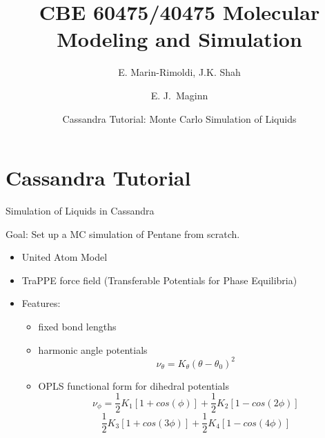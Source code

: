 \documentclass{beamer}
\title[Molecular Modeling and Simulation] %
{CBE 60475/40475 Molecular Modeling and Simulation}
\author[Marin, Shah and Maginn, Univ. of Notre Dame] %
{E. Marin-Rimoldi, J.K. Shah \and  E. J.~Maginn}
\institute[University of Notre Dame] %
{
  Department of Chemical and Biomolecular Engineering\\
  University of Notre Dame \\
  Notre Dame, IN 46556 USA}
\date[September 9, 2013] %
{Cassandra Tutorial: Monte Carlo Simulation of Liquids}
\begin{document}
\begin{frame}
  \titlepage
\end{frame}

\section{Cassandra Tutorial}
\begin{frame}{Simulation of Liquids in Cassandra}

Goal: Set up a MC simulation of Pentane from scratch.

\begin{itemize}
\item United Atom Model
\item TraPPE force field (Transferable Potentials for Phase Equilibria)
\item Features:
\begin{itemize}
	\item fixed bond lengths
	\item harmonic angle potentials
		\begin{equation}
			\nu_\theta = K_\theta(\theta-\theta_0)^2
		\end{equation}
	\item OPLS functional form for dihedral potentials
		\begin{equation}
                        \nu_\phi = \frac{1}{2}K_1[1+cos(\phi)]+\frac{1}{2}K_2[1-cos(2\phi)]
                \end{equation}
		\begin{equation}
\frac{1}{2}K_3[1+cos(3\phi)]+\frac{1}{2}K_4[1-cos(4\phi)]
		\end{equation}

\end{itemize}
\end{itemize}
\end{frame}

\end{document}
